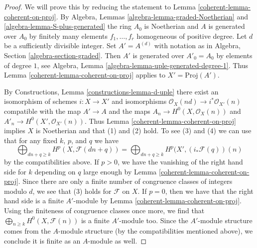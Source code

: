 \begin{proof}

We will prove this by reducing the statement to
Lemma \ref{coherent-lemma-coherent-on-proj}.
By Algebra, Lemmas \ref{algebra-lemma-graded-Noetherian} and
\ref{algebra-lemma-S-plus-generated} the ring $A_0$ is Noetherian
and $A$ is generated over $A_0$ by finitely many elements
$f_1, \ldots, f_r$ homogeneous of positive degree.
Let $d$ be a sufficiently divisible integer. Set $A' = A^{(d)}$ with notation
as in Algebra, Section \ref{algebra-section-graded}.
Then $A'$ is generated over $A'_0 = A_0$ by elements of
degree $1$, see Algebra, Lemma \ref{algebra-lemma-uple-generated-degree-1}.
Thus Lemma \ref{coherent-lemma-coherent-on-proj} applies to $X' = \text{Proj}(A')$.

\medskip\noindent
By Constructions, Lemma \ref{constructions-lemma-d-uple} there exist
an isomorphism of schemes $i : X \to X'$ and
isomorphisms $\mathcal{O}_X(nd) \to i^*\mathcal{O}_{X'}(n)$
compatible with the map $A' \to A$ and the maps
$A_n \to H^0(X, \mathcal{O}_X(n))$ and $A'_n \to H^0(X', \mathcal{O}_{X'}(n))$.
Thus Lemma \ref{coherent-lemma-coherent-on-proj} implies $X$ is Noetherian and that
(1) and (2) hold. To see (3) and (4)
we can use that for any fixed $k$, $p$, and $q$ we have
$$
\bigoplus\nolimits_{dn + q \geq k} H^p(X, \mathcal{F}(dn + q)) =
\bigoplus\nolimits_{dn + q \geq k} H^p(X', (i_*\mathcal{F}(q))(n)
$$
by the compatibilities above. If $p > 0$, we have the vanishing of the right
hand side for $k$ depending on $q$ large enough by
Lemma \ref{coherent-lemma-coherent-on-proj}. Since there are only a finite number
of congruence classes of integers modulo $d$, we see that (3) holds for
$\mathcal{F}$ on $X$. If $p = 0$, then we have that the right hand side
is a finite $A'$-module by Lemma \ref{coherent-lemma-coherent-on-proj}. Using
the finiteness of congruence classes once more, we find that
$\bigoplus_{n \geq k} H^0(X, \mathcal{F}(n))$ is a finite $A'$-module too.
Since the $A'$-module structure comes from the $A$-module structure
(by the compatibilities mentioned above), we conclude it is finite
as an $A$-module as well.
\end{proof}

